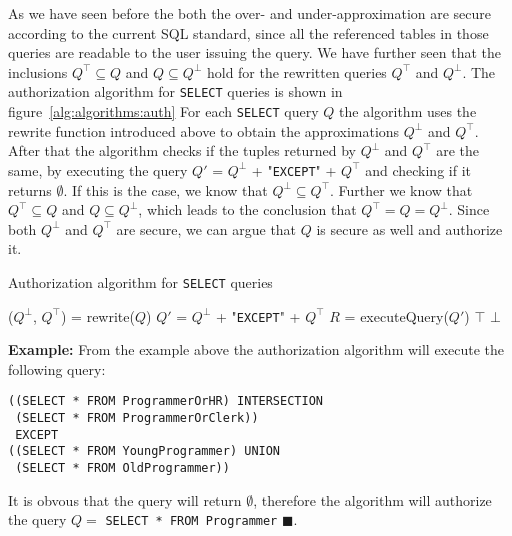 As we have seen before the both the over- and under-approximation are secure according to the current SQL standard, since all the referenced tables in those queries are readable to the user issuing the query.
%
We have further seen that the inclusions $Q^\top \subseteq Q$ and $Q \subseteq Q^\bot$ hold for the rewritten queries $Q^\top$ and $Q^\bot$.
%
The authorization algorithm for \texttt{SELECT} queries is shown in figure~\ref{alg:algorithms:auth}
%
For each \texttt{SELECT} query $Q$ the algorithm uses the rewrite function introduced above to obtain the approximations $Q^\bot$ and $Q^\top$.
%
After that the algorithm checks if the tuples returned by $Q^\bot$ and $Q^\top$ are the same, by executing the query $Q'$ = $Q^\bot$ + "\texttt{EXCEPT}" + $Q^\top$ and checking if it returns $\emptyset$.
%
If this is the case, we know that $Q^\bot \subseteq Q^\top$.
%
Further we know that $Q^\top \subseteq Q$ and $Q \subseteq Q^\bot$, which leads to the conclusion that $Q^\top = Q = Q^\bot$.
%
Since both $Q^\bot$ and $Q^\top$ are secure, we can argue that $Q$ is secure as well and authorize it.
%
\begin{algorithm}
\caption{Authorization algorithm for \texttt{SELECT} queries}
\label{alg:algorithms:auth}
	\SetAlgoLined
	($Q^\bot$, $Q^\top$) = rewrite($Q$)\;
	$Q'$ = $Q^\bot$ + "\texttt{EXCEPT}" + $Q^\top$\;
	$R$ = executeQuery($Q'$)\;
		{\Return $\top$ \;}
		{\Return $\bot$ \;}
\end{algorithm}

\smallskip
\noindent
{\bf Example:}
From the example above the authorization algorithm will execute the following query:
\begin{verbatim}
((SELECT * FROM ProgrammerOrHR) INTERSECTION
 (SELECT * FROM ProgrammerOrClerk))
 EXCEPT
((SELECT * FROM YoungProgrammer) UNION
 (SELECT * FROM OldProgrammer))
\end{verbatim}
\noindent
It is obvous that the query will return $\emptyset$, therefore the algorithm will authorize the query $Q = $ \texttt{SELECT * FROM Programmer} $\blacksquare$.